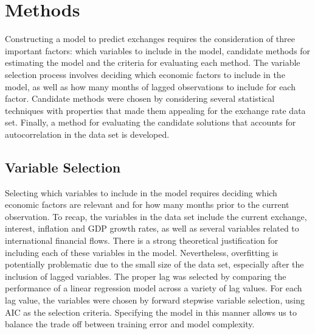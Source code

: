 \documentclass{sig-alternate-05-2015}
\begin{document}
\section{Methods}
Constructing a model to predict exchanges requires the consideration of three important factors: which variables to include in the model, candidate methods for estimating the model and the criteria for evaluating each method. The variable selection process involves deciding which economic factors to include in the model, as well as how many months of lagged observations to include for each factor. Candidate methods were chosen by considering several statistical techniques with properties that made them appealing for the exchange rate data set. Finally, a method for evaluating the candidate solutions that accounts for autocorrelation in the data set is developed.

\subsection{Variable Selection}
Selecting which variables to include in the model requires deciding which economic factors are relevant and for how many months prior to the current observation. To recap, the variables in the data set include the current exchange, interest, inflation and GDP growth rates, as well as several variables related to international financial flows. There is a strong theoretical justification for including each of these variables in the model. Nevertheless, overfitting is potentially problematic due to the small size of the data set, especially after the inclusion of lagged variables. The proper lag was selected by comparing the performance of a linear regression model across a variety of lag values. For each lag value, the variables were chosen by forward stepwise variable selection, using AIC as the selection criteria. Specifying the model in this manner allows us to balance the trade off between training error and model complexity.
\end{document}

